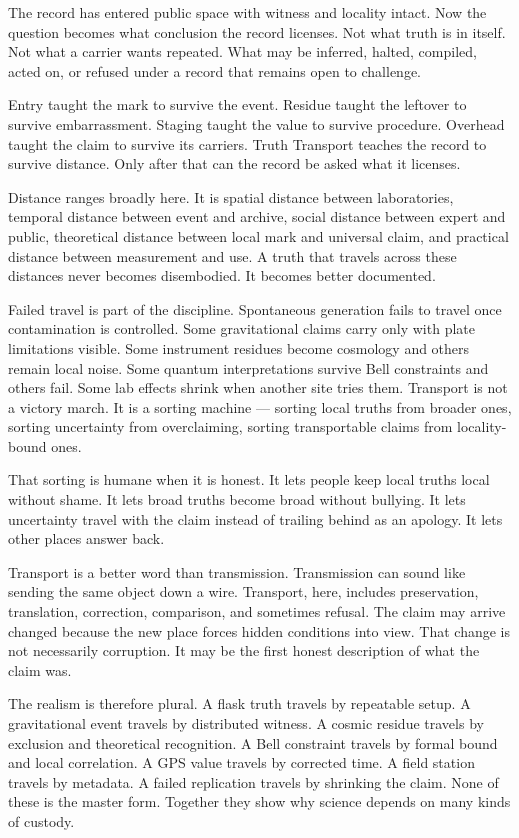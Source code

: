 \begin{movementclose}
The record has entered public space with witness and locality intact.
Now the question becomes what conclusion the record licenses. Not what
truth is in itself. Not what a carrier wants repeated. What may be
inferred, halted, compiled, acted on, or refused under a record that
remains open to challenge.

Entry taught the mark to survive the event. Residue taught the leftover
to survive embarrassment. Staging taught the value to survive procedure.
Overhead taught the claim to survive its carriers. Truth Transport
teaches the record to survive distance. Only after that can the record
be asked what it licenses.

Distance ranges broadly here. It is spatial distance between
laboratories, temporal distance between event and archive, social
distance between expert and public, theoretical distance between local
mark and universal claim, and practical distance between measurement and
use. A truth that travels across these distances never becomes
disembodied. It becomes better documented.

Failed travel is part of the discipline. Spontaneous generation fails to
travel once contamination is controlled. Some gravitational claims carry
only with plate limitations visible. Some instrument residues become
cosmology and others remain local noise. Some quantum interpretations
survive Bell constraints and others fail. Some lab effects shrink when
another site tries them. Transport is not a victory march. It is a
sorting machine --- sorting local truths from broader ones, sorting
uncertainty from overclaiming, sorting transportable claims from
locality-bound ones.

That sorting is humane when it is honest. It lets people keep local
truths local without shame. It lets broad truths become broad without
bullying. It lets uncertainty travel with the claim instead of trailing
behind as an apology. It lets other places answer back.

Transport is a better word than transmission. Transmission can sound
like sending the same object down a wire. Transport, here, includes
preservation, translation, correction, comparison, and sometimes
refusal. The claim may arrive changed because the new place forces
hidden conditions into view. That change is not necessarily corruption.
It may be the first honest description of what the claim was.

The realism is therefore plural. A flask truth travels by repeatable
setup. A gravitational event travels by distributed witness. A cosmic
residue travels by exclusion and theoretical recognition. A Bell
constraint travels by formal bound and local correlation. A GPS value
travels by corrected time. A field station travels by metadata. A
failed replication travels by shrinking the claim. None of these is the
master form. Together they show why science depends on many kinds of
custody.


\end{movementclose}
